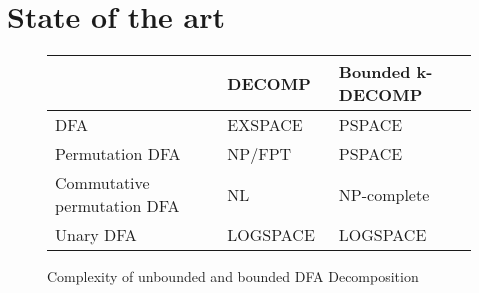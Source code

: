 \section{State of the art}
\begin{figure}[b]
	\begin{tabular}{l|lll}
		&  & DECOMP & Bounded k-DECOMP  \\
		\hline
		DFA&  & EXSPACE~\cite{prime-languages} & PSPACE~\cite{DBLP:journals/corr/abs-2107-04683}  \\
		Permutation DFA&  & NP/FPT\cite{DBLP:journals/corr/abs-2107-04683}  & PSPACE~\cite{DBLP:journals/corr/abs-2107-04683} \\
		Commutative permutation DFA&  & NL~\cite{DBLP:journals/corr/abs-2107-04683} & NP-complete~\cite{DBLP:journals/corr/abs-2107-04683} \\
		Unary DFA&  & LOGSPACE~\cite{unara-prime-languages} &  LOGSPACE~\cite{DBLP:journals/corr/abs-2107-04683}
	\end{tabular}
	\caption{Complexity of unbounded and bounded DFA Decomposition}
	\label{tab:dfa-decomp-complexity}
\end{figure}

